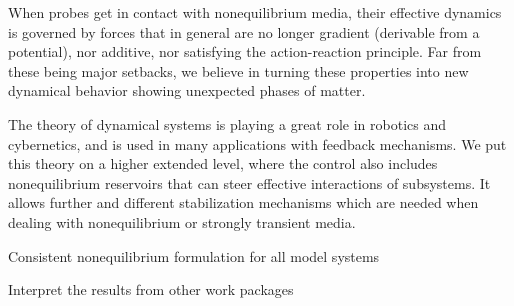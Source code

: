 \begin{workpackage}[id=WPcore,wphases=0-48,
  short=Gen. Theory, %
  title=General Theory, %
  lead=KUL,
  KULRM=36,UNIPDRM=6]
\begin{wpdescription}
\printbibliography[heading=proposal-bib,env=proposal-env]

\end{wpdescription}

\begin{tasklist}

\begin{task}[title=Give the theory of statistical forces outside equilibrium,id=core-t1,lead=KUL,partners={UNIPD},wphases={0-24!0.5,12-30}]
When probes get in contact with nonequilibrium media, their effective dynamics is governed
by forces that in general are no longer gradient (derivable from a potential), nor additive,
nor satisfying the action-reaction principle. Far from these being major setbacks, we
believe in turning these properties into new dynamical behavior showing unexpected phases of
matter.
\end{task}

\begin{task}[title=Formulate stability and control theory,id=core-t2,PM=12,lead=KUL,wphases=12-36!0.5]
The theory of dynamical systems is playing a great role in robotics and cybernetics, and is
used in many applications with feedback mechanisms. We put this theory on a higher extended
level, where the control also includes nonequilibrium reservoirs that can steer effective
interactions of subsystems.
%
It allows further and different stabilization mechanisms which are needed when dealing with
nonequilibrium or strongly transient media.
\end{task}

\end{tasklist}

\begin{wpdelivs}
  \begin{wpdeliv}[due=18,id=core-d1,dissem=PU,nature=DEM,lead=KUL,miles=framework]
      {Consistent nonequilibrium formulation for all model systems}
  \end{wpdeliv}
  \begin{wpdeliv}[due=36,id=core-d2,dissem=PU,nature=DEM,lead=KUL,miles=final]
      {Interpret the results from other work packages}
  \end{wpdeliv}
\end{wpdelivs}

\end{workpackage}
